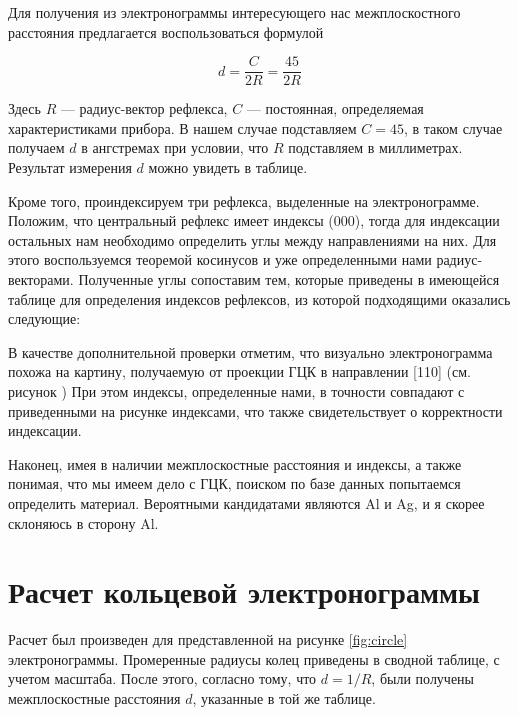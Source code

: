 \documentclass[a4paper, 12pt]{article}
\begin{document}
Для получения из электронограммы интересующего нас межплоскостного расстояния предлагается воспользоваться формулой

\begin{equation}
	d = \frac{C}{2 R} = \frac{45}{2 R}
\end{equation}

Здесь $R$ --- радиус-вектор рефлекса, $C$ --- постоянная, определяемая характеристиками прибора. В нашем случае подставляем $C = 45$, в таком случае получаем $d$ в ангстремах при условии, что $R$ подставляем в миллиметрах. Результат измерения $d$ можно увидеть в таблице.

Кроме того, проиндексируем три рефлекса, выделенные на электронограмме. Положим, что центральный рефлекс имеет индексы (000), тогда для индексации остальных нам необходимо определить углы между направлениями на них. Для этого воспользуемся теоремой косинусов и уже определенными нами радиус-векторами. Полученные углы сопоставим тем, которые приведены в имеющейся таблице для определения индексов рефлексов, из которой подходящими оказались следующие: %

В качестве дополнительной проверки отметим, что визуально электронограмма похожа на картину, получаемую от проекции ГЦК в направлении [110] (см. рисунок )%
При этом индексы, определенные нами, в точности совпадают с приведенными на рисунке индексами, что также свидетельствует о корректности индексации.

Наконец, имея в наличии межплоскостные расстояния и индексы, а также понимая, что мы имеем дело с ГЦК, поиском по базе данных попытаемся определить материал. Вероятными кандидатами являются Al и Ag, и я скорее склоняюсь в сторону Al.


\section{Расчет кольцевой электронограммы}

Расчет был произведен для представленной на рисунке \ref{fig:circle} электронограммы. Промеренные радиусы колец приведены в сводной таблице, с учетом масштаба. После этого, согласно тому, что $d = 1 / R$, были получены межплоскостные расстояния $d$, указанные в той же таблице.
\end{document}
